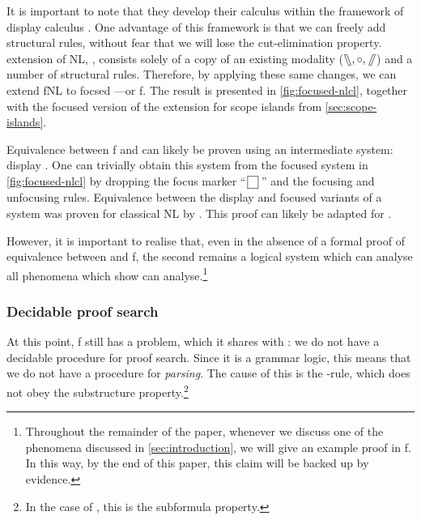 \documentclass[10pt,a4paper]{llncs}
\begin{document}
It is important to note that they develop their calculus within the
framework of display calculus \citep{belnap1982}.
One advantage of this framework is that we can freely add structural
rules, without fear that we will lose the cut-elimination property.
 extension of NL, {\NLCL}, consists solely of a copy
of an existing modality ($\fatbslash,\mathbin{\circ},\mathbin{\!\fatslash\,}$) and a number of
structural rules.
Therefore, by applying these same changes, we can extend fNL to focsed
{\NLCL}---or {f\NLCL}.
The result is presented in \autoref{fig:focused-nlcl},
together with the focused version of the extension for scope islands
from \autoref{sec:scope-islands}.



Equivalence between {f\NLCL} and {\NLCL} can likely be proven using
an intermediate system: display {\NLCL}. One can trivially obtain this
system from the focused system in \autoref{fig:focused-nlcl} by
dropping the focus marker ``$\,\boxed{ \phantom{\cdot} }\,$'' and the
focusing and unfocusing rules.
Equivalence between the display and focused variants of a system was
proven for classical NL by \citet{bastenhof2011}.
This proof can likely be adapted for {\NLCL}.


However, it is important to realise that, even in the absence of a
formal proof of equivalence between {\NLCL} and {f\NLCL}, the second
remains a logical system which can analyse all phenomena which
\citet{barker2015} show {\NLCL} can analyse.\footnote{%
  Throughout the remainder of the paper, whenever we discuss one of
  the phenomena discussed in \autoref{sec:introduction}, we will give
  an example proof in {f\NLCL}. In this way, by the end of this paper,
  this claim will be backed up by evidence.
}

\subsubsection{Decidable proof search}%
\label{sec:decidable-proof-search}

At this point, {f\NLCL} still has a problem, which it shares with
{\NLCL}: we do not have a decidable procedure for proof search.
Since it is a grammar logic, this means that we do not have a
procedure for \emph{parsing}.
The cause of this is the \I-rule, which does not obey the substructure
property.\footnote{%
  In the case of {\NLCL}, this is the subformula property.
}
\end{document}
